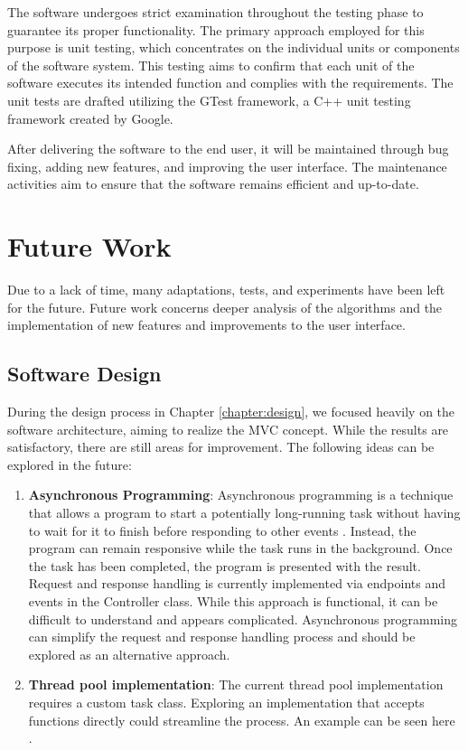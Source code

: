 The software undergoes strict examination throughout the testing phase to guarantee its proper functionality. The primary approach employed for this purpose is unit testing, which concentrates on the individual units or components of the software system. This testing aims to confirm that each unit of the software executes its intended function and complies with the requirements. The unit tests are drafted utilizing the GTest framework, a C++ unit testing framework created by Google.

After delivering the software to the end user, it will be maintained through bug fixing, adding new features, and improving the user interface. The maintenance activities aim to ensure that the software remains efficient and up-to-date.

\section{Future Work}

Due to a lack of time, many adaptations, tests, and experiments have been left for the future. Future work concerns deeper analysis of the algorithms and the implementation of new features and improvements to the user interface.

\subsection{Software Design}

During the design process in Chapter \ref{chapter:design}, we focused heavily on the software architecture, aiming to realize the MVC concept. While the results are satisfactory, there are still areas for improvement. The following ideas can be explored in the future:

\begin{enumerate}
    \item \textbf{Asynchronous Programming}: Asynchronous programming is a technique that allows a program to start a potentially long-running task without having to wait for it to finish before responding to other events \cite{MozDevNet}. Instead, the program can remain responsive while the task runs in the background. Once the task has been completed, the program is presented with the result. Request and response handling is currently implemented via endpoints and events in the Controller class. While this approach is functional, it can be difficult to understand and appears complicated. Asynchronous programming can simplify the request and response handling process and should be explored as an alternative approach.
    \item \textbf{Thread pool implementation}: The current thread pool implementation requires a custom task class. Exploring an implementation that accepts functions directly could streamline the process. An example can be seen here \cite{Mtrebi}.
\end{enumerate}

